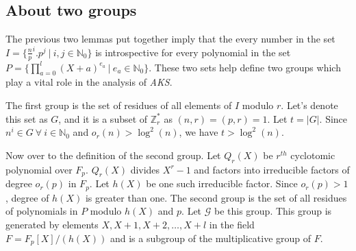 \documentclass[11pt]{report}
\begin{document}
\subsection{About two groups}
The previous two lemmas put together imply that the every number in the set $I = \{\frac{n}{p}^i.p^j\ |\ i,j \in \mathbb{N}_0\}$ is introspective for every polynomial in the set $P = \{\prod_{a=0}^{l}{(X+a)^{e_a}}\ |\ e_a \in \mathbb{N}_0\}$. These two sets help define two groups which play a vital role in the analysis of \emph{AKS}.

The first group is the set of residues of all elements of $I$ modulo $r$. Let's denote this set as $G$, and it is a subset of $\mathbb{Z}_r^*$ as $(n,r) = (p,r) = 1$. Let $t = |G|$. Since $n^i \in G \ \forall \ i \in \mathbb{N}_0$ and $o_r(n) > \log^2(n)$, we have $t > \log^2(n)$.

Now over to the definition of the second group. Let $Q_r(X)$ be $r^{th}$ cyclotomic polynomial over $F_p$. $Q_r(X)$ divides $X^r-1$ and factors into irreducible factors of degree $o_r(p)$ in $F_p$. Let $h(X)$ be one such irreducible factor. Since $o_r(p) > 1$, degree of $h(X)$ is greater than one. The second group is the set of all residues of polynomials in $P$ modulo $h(X)$ and $p$. Let $\mathcal{G}$ be this group. This group is generated by elements $X, X + 1, X + 2, \dots, X + l$ in the field $F = F_p[X]/(h(X))$ and is a subgroup of the multiplicative group of $F$.
\end{document}

